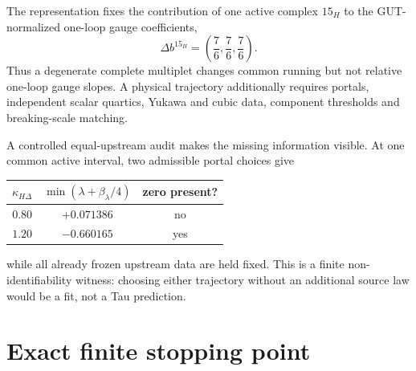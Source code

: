 The representation fixes the contribution of one active complex $15_H$ to
the GUT-normalized one-loop gauge coefficients,
\begin{equation}
 \boxed{\Delta b^{15_H}=\left(\frac76,\frac76,\frac76\right).}
 \label{eq:gaugeshift}
\end{equation}
Thus a degenerate complete multiplet changes common running but not relative
one-loop gauge slopes.  A physical trajectory additionally requires portals,
independent scalar quartics, Yukawa and cubic data, component thresholds and
breaking-scale matching.

A controlled equal-upstream audit makes the missing information visible.  At
one common active interval, two admissible portal choices give
\begin{center}
\begin{tabular}{@{}ccc@{}}
\toprule
$\kappa_{H\Delta}$ & $\min(\lambda+\beta_\lambda/4)$ & zero present?\\
\midrule
$0.80$ & $+0.071386$ & no\\
$1.20$ & $-0.660165$ & yes\\
\bottomrule
\end{tabular}
\end{center}
while all already frozen upstream data are held fixed.  This is a finite
non-identifiability witness: choosing either trajectory without an additional
source law would be a fit, not a Tau prediction.

\section{Exact finite stopping point}

